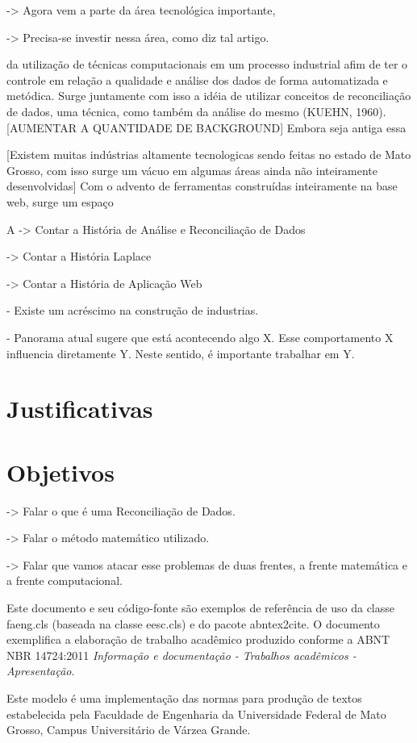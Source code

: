-> Agora vem a parte da área tecnológica importante, 

-> Precisa-se investir nessa área, como diz tal artigo.




da utilização de técnicas computacionais em um processo industrial afim de ter o controle em relação a qualidade e análise dos dados de forma automatizada e metódica. Surge juntamente com isso a idéia de utilizar conceitos de reconciliação de dados, uma técnica, como também da análise do mesmo (KUEHN, 1960). [AUMENTAR A QUANTIDADE DE BACKGROUND]
Embora seja antiga essa 

[Existem muitas indústrias altamente tecnologicas sendo feitas no estado de Mato Grosso, com isso surge um vácuo em algumas áreas ainda não inteiramente desenvolvidas]
Com o advento de ferramentas construídas inteiramente na base web, surge um espaço

A 
-> Contar a História de Análise e Reconciliação de Dados

-> Contar a História Laplace

-> Contar a História de Aplicação Web

- Existe um acréscimo na construção de industrias.


- Panorama atual sugere que está acontecendo algo X. Esse comportamento X influencia diretamente Y. Neste sentido, é importante trabalhar em Y.


\section{Justificativas}


\section{Objetivos}

-> Falar o que é uma Reconciliação de Dados.

-> Falar o método matemático utilizado.

-> Falar que vamos atacar esse problemas de duas frentes, a frente matemática e a frente computacional.

Este documento e seu código-fonte são exemplos de referência de uso da classe \textsf{faeng.cls} (baseada na classe \textsf{eesc.cls}) e do pacote \textsf{abntex2cite}. O documento exemplifica a elaboração de trabalho acadêmico produzido conforme a \ac{ABNT} \ac{NBR} 14724:2011 \emph{Informação e documentação - Trabalhos acadêmicos - Apresentação}.

Este modelo é uma implementação das normas para produção de textos estabelecida pela Faculdade de Engenharia da Universidade Federal de Mato Grosso, Campus Universitário de Várzea Grande.